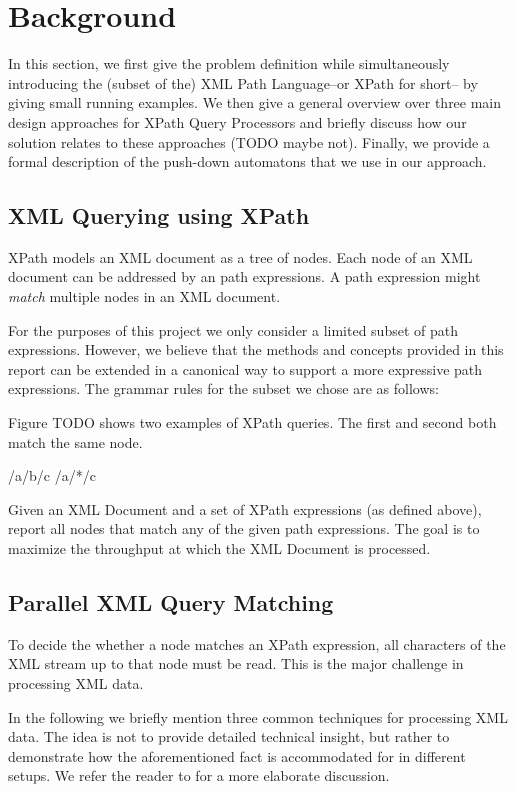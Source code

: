 \section{Background}\label{sec:background}
In this section, we first give the problem definition while simultaneously
introducing the (subset of the) XML Path Language–or XPath for short–
by giving small running examples.
We then give a general overview over three main design approaches for XPath
Query Processors and briefly discuss how our solution relates to these
approaches (TODO maybe not). Finally, we provide a formal description of the
push-down automatons that we use in our approach.

\subsection{XML Querying using XPath}

XPath models an XML document as a tree of nodes. Each node of an XML document
can be addressed by an path expressions. A path expression might \emph{match}
multiple nodes in an XML document.

For the purposes of this project we only consider a limited subset of path
expressions. However, we believe that the methods and concepts provided in this
report can be extended in a canonical way to support a more expressive path
expressions. The grammar rules for the subset we chose are as follows:


Figure TODO shows two examples of XPath queries. The first and second both match
the same node.

/a/b/c
/a/*/c

 Given an XML Document and a set of XPath
expressions (as defined above), report all nodes that match any of the given
path expressions. The goal is to maximize the throughput at which the XML
Document is processed.


\subsection{Parallel XML Query Matching}
To decide the whether a node matches an XPath expression, all characters of the
XML stream up to that node must be read. This is the major challenge in
processing XML data.

In the following we briefly mention three common techniques for processing XML
data. The idea is not to provide detailed technical insight, but rather to
demonstrate how the aforementioned fact is accommodated for in different
setups. We refer the reader to  for a more elaborate
discussion.

